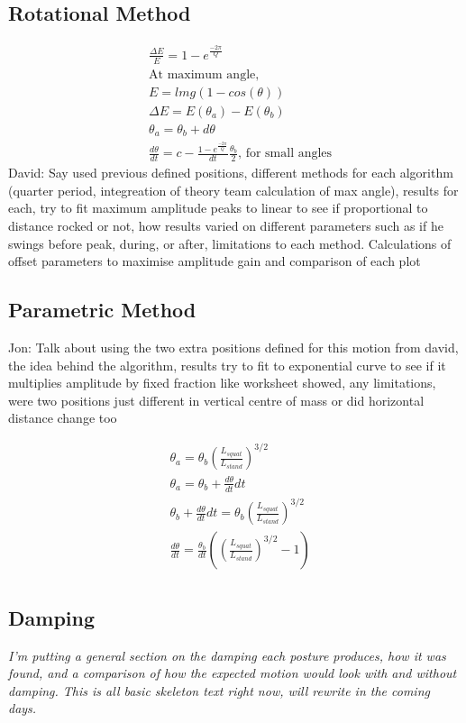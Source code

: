 \documentclass[11pt]{article}
\newcommand*\ruleline[1]{\par\noindent\raisebox{.8ex}{\makebox[\linewidth]{\hrulefill\hspace{1ex}\raisebox{-.8ex}{#1}\hspace{1ex}\hrulefill}}}
\begin{document}
\subsection{Rotational Method}
\ruleline{David Thomas}
\begin{align}
    &\frac{\Delta E}{E} = 1 - e^{\frac{-2\pi}{Q}}\\
    &\text{At maximum angle},\\
    &E = lmg(1-cos(\theta))\\
    &\Delta E = E(\theta_a) - E(\theta_b)\\
    &\theta_a = \theta_b + d\theta\\
    &\frac{d\theta}{dt} = c - \frac{1-e^{\frac{-2\pi}{Q}}}{dt}\frac{\theta_b}{2}, \, \text{for small angles}
\end{align}
David: Say used previous defined positions, different methods for each algorithm (quarter period, integreation of theory team calculation of max angle), results for each, try to fit maximum amplitude peaks to linear to see if proportional to distance rocked or not, how results varied on different parameters such as if he swings before peak, during, or after, limitations to each method.
Calculations of offset parameters to maximise amplitude gain and comparison of each plot

\subsection{Parametric Method}
Jon: Talk about using the two extra positions defined for this motion from david, the idea behind the algorithm, results try to fit to exponential curve to see if it multiplies amplitude by fixed fraction like worksheet showed, any limitations, were two positions just different in vertical centre of mass or did horizontal distance change too

\begin{align}
    &\theta_a = \theta_b (\frac{L_{squat}}{L_{stand}})^{3/2}\\
    &\theta_a = \theta_b + \frac{d\theta}{dt}dt\\
    &\theta_b + \frac{d\theta}{dt}dt = \theta_b (\frac{L_{squat}}{L_{stand}})^{3/2}\\
    &\frac{d\theta}{dt} = \frac{\theta_b}{dt} ((\frac{L_{squat}}{L_{stand}})^{3/2} - 1)\\ 
\end{align}


\subsection{Damping}
\ruleline{James Doering}
\textit{I'm putting a general section on the damping each posture produces, how it was found, and a comparison of how the expected motion would look with and without damping. This is all basic skeleton text right now, will rewrite in the coming days.}
\end{document}
